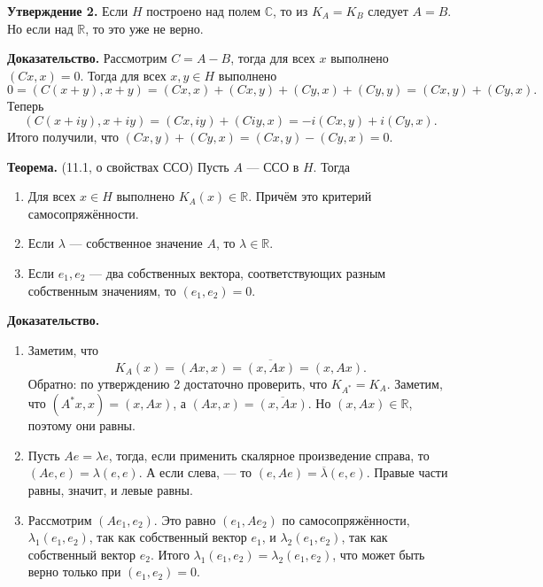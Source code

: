 \textbf{Утверждение 2.} Если $H$ построено над полем $\mathbb C$, то из $K_A = K_B$ следует $A = B$.
Но если над $\mathbb R$, то это уже не верно.

\textbf{Доказательство.} Рассмотрим $C = A - B$, тогда для всех $x$ выполнено $(Cx, x) = 0$.
Тогда для всех $x, y \in H$ выполнено
\[
    0 = (C(x + y), x + y) = (Cx, x) + (Cx, y)+ (Cy, x) + (Cy, y) = (Cx, y)+ (Cy, x).
\]
Теперь
\[
    (C(x + iy), x + iy) = (Cx, iy) + (Ciy, x) = -i(Cx, y) + i(Cy, x).
\]
Итого получили, что $(Cx, y) + (Cy, x) = (Cx, y) - (Cy, x) = 0$.

\QED

\label{th:11-1} \textbf{Теорема.} (11.1, о свойствах ССО) Пусть $A$ --- ССО в $H$.
Тогда
\begin{enumerate}
    \item Для всех $x \in H$ выполнено $K_A(x) \in \mathbb R$.
        Причём это критерий самосопряжённости.
    \item Если $\lambda$ --- собственное значение $A$, то $\lambda \in \mathbb R$.
    \item Если $e_1, e_2$ --- два собственных вектора, соответствующих разным собственным значениям, то $(e_1, e_2) = 0$.
\end{enumerate}

\textbf{Доказательство.}
\begin{enumerate}
    \item Заметим, что 
        \[
            K_A(x) = (Ax, x) = \overline{(x, Ax)} = (x, Ax).
        \]
        Обратно: по утверждению 2 достаточно проверить, что $K_{A^*} = K_A$.
        Заметим, что $(A^* x, x) = (x, Ax)$, а $(Ax, x) = \overline{(x, Ax)}$.
        Но $(x, Ax) \in \mathbb R$, поэтому они равны.

    \item Пусть $Ae = \lambda e$, тогда, если применить скалярное произведение справа, то $(Ae, e) = \lambda (e, e)$.
        А если слева, --- то $(e, Ae) = \overline \lambda (e, e)$.
        Правые части равны, значит, и левые равны.

    \item Рассмотрим $(Ae_1, e_2)$.
        Это равно $(e_1, Ae_2)$ по самосопряжённости, $\lambda_1(e_1, e_2)$, так как собственный вектор $e_1$, и $\lambda_2(e_1, e_2)$, так как собственный вектор $e_2$.
        Итого $\lambda_1(e_1, e_2) = \lambda_2 (e_1, e_2)$, что может быть верно только при $(e_1, e_2) = 0$.
\end{enumerate}

\QED


